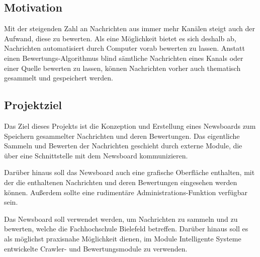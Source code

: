 \subsection{Motivation}
Mit der steigenden Zahl an Nachrichten aus immer mehr Kanälen steigt auch der Aufwand,
diese zu bewerten. Als eine Möglichkeit bietet es sich deshalb ab,
Nachrichten automatisiert durch Computer vorab bewerten zu lassen.
Anstatt einen Bewertungs-Algorithmus blind sämtliche Nachrichten eines Kanals
oder einer Quelle bewerten zu lassen, können Nachrichten vorher auch thematisch gesammelt
und gespeichert werden.

\subsection{Projektziel}
Das Ziel dieses Projekts ist die Konzeption und Erstellung eines Newsboards zum Speichern
gesammelter Nachrichten und deren Bewertungen. Das eigentliche Sammeln
und Bewerten der Nachrichten geschieht durch externe Module,
die über eine Schnittstelle mit dem Newsboard kommunizieren.

Darüber hinaus soll das Newsboard auch eine grafische Oberfläche enthalten,
mit der die enthaltenen Nachrichten und deren Bewertungen eingesehen werden können.
Außerdem sollte eine rudimentäre Administrations-Funktion verfügbar sein.

Das Newsboard soll verwendet werden, um Nachrichten zu sammeln und zu bewerten,
welche die Fachhochschule Bielefeld betreffen. Darüber hinaus soll es
als möglichst praxisnahe Möglichkeit dienen, im Module Intelligente Systeme entwickelte
Crawler- und Bewertungsmodule zu verwenden.
